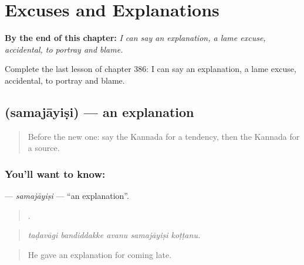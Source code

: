 
\chapter{Excuses and Explanations}
\label{ch:ka-excuses-and-explanations}

\begin{chapteropening}
\textbf{By the end of this chapter:} \emph{I can say an explanation, a lame excuse, accidental, to portray and blame.}

Complete the last lesson of chapter 386: I can say an explanation, a lame excuse, accidental, to portray and blame.
\end{chapteropening}

\section[\texorpdfstring{\kn{ಸಮಜಾಯಿಷಿ} (samajāyiṣi)}{ಸಮಜಾಯಿಷಿ (samajāyiṣi)}]{ (samajāyiṣi) — an explanation}

\label{lesson:KA-C386-samajayisi}



\begin{quote}
Before the new one: say the Kannada for a tendency, then the Kannada for a source.
\end{quote}

\subsection*{You'll want to know: }
\textbf{} — \emph{samajāyiṣi} — \textquotedblleft{}an explanation\textquotedblright{}.

\begin{quote}
    .
\end{quote}

\begin{quote}
\emph{taḍavāgi bandiddakke avanu samajāyiṣi koṭṭanu.}
\end{quote}

\begin{quote}
He gave an explanation for coming late.
\end{quote}

